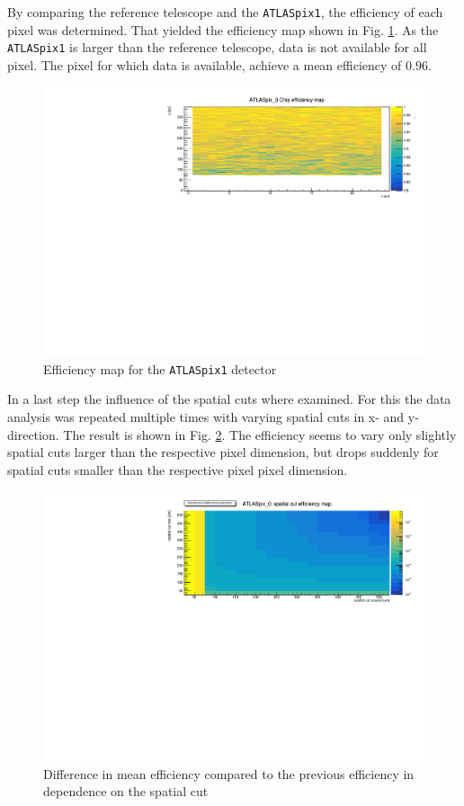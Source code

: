 \documentclass[twocolumn,DIV=14,a4paper,biblatex, 10pt]{scrartcl}
\newcommand{\atlaspix}{\texttt{ATLASpix1}\xspace}
\begin{document}
By comparing the reference telescope and the \atlaspix, the efficiency of each pixel was determined. That yielded the efficiency map shown in Fig. \ref{fig:efficiency_map}. As the \atlaspix is larger than the reference telescope, data is not available for all pixel. The pixel for which data is available, achieve a mean efficiency of $\num{0.96}$. 

\begin{figure}
  \centering
  \includegraphics[width=\linewidth]{10_chip_efficiency_map_z_zoom.pdf}
  \caption{Efficiency map for the \atlaspix detector}
  \label{fig:efficiency_map}
\end{figure}

In a last step the influence of the spatial cuts where examined. For this the data analysis was repeated multiple times with varying spatial cuts in x- and y-direction. The result is shown in Fig. \ref{fig:spatial_cuts}. The efficiency seems to vary only slightly spatial cuts larger than the respective pixel dimension, but drops suddenly for spatial cuts smaller than the respective pixel pixel dimension.

\begin{figure}
  \centering
  \includegraphics[width=\linewidth]{11_spatial_cut_analysis.pdf}
  \caption{Difference in mean efficiency compared to the previous efficiency in dependence on the spatial cut }
  \label{fig:spatial_cuts}
\end{figure}
\end{document}
